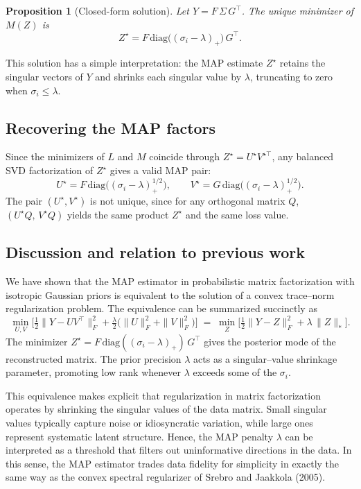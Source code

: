 \documentclass[11pt]{article}
\theoremstyle{spaced}
\newtheorem{proposition}{Proposition}
\begin{document}
\begin{proposition}[Closed-form solution]
Let \(Y = F\,\Sigma\,G^\top\).  
The unique minimizer of \(M(Z)\) is
\[
Z^\star = F\,\mathrm{diag}\big((\sigma_i - \lambda)_+\big)\,G^\top.
\]
\end{proposition}

This solution has a simple interpretation: the MAP estimate \(Z^\star\) retains the singular vectors of \(Y\) and shrinks each singular value by \(\lambda\), truncating to zero when \(\sigma_i \le \lambda\).

\subsection*{Recovering the MAP factors}

Since the minimizers of \(L\) and \(M\) coincide through \(Z^\star = U^\star V^{\star\top}\), any balanced SVD factorization of \(Z^\star\) gives a valid MAP pair:
\[
U^\star = F\,\mathrm{diag}\big((\sigma_i - \lambda)_+^{1/2}\big),
\qquad
V^\star = G\,\mathrm{diag}\big((\sigma_i - \lambda)_+^{1/2}\big).
\]
The pair \((U^\star,V^\star)\) is not unique, since for any orthogonal matrix \(Q\),
\((U^\star Q,\, V^\star Q)\) yields the same product \(Z^\star\) and the same loss value.

\subsection*{Discussion and relation to previous work}

We have shown that the MAP estimator in probabilistic matrix factorization with isotropic Gaussian priors is equivalent to the solution of a convex trace--norm regularization problem.  
The equivalence can be summarized succinctly as
\[
\boxed{
\min_{U,V}
\Big[
\tfrac{1}{2}\|Y - UV^\top\|_F^2
+ \tfrac{\lambda}{2}\big(\|U\|_F^2 + \|V\|_F^2\big)
\Big]
\;=\;
\min_Z
\Big[
\tfrac{1}{2}\|Y - Z\|_F^2 + \lambda\,\|Z\|_*
\Big].
}
\]
The minimizer \(Z^\star = F\,\mathrm{diag}((\sigma_i - \lambda)_+)\,G^\top\) gives the posterior mode of the reconstructed matrix.  
The prior precision \(\lambda\) acts as a singular--value shrinkage parameter, promoting low rank whenever \(\lambda\) exceeds some of the \(\sigma_i\).

This equivalence makes explicit that regularization in matrix factorization operates by shrinking the singular values of the data matrix.
Small singular values typically capture noise or idiosyncratic variation, while large ones represent systematic latent structure.
Hence, the MAP penalty \(\lambda\) can be interpreted as a threshold that filters out uninformative directions in the data.
In this sense, the MAP estimator trades data fidelity for simplicity in exactly the same way as the convex spectral regularizer of Srebro and Jaakkola (2005).
\end{document}
